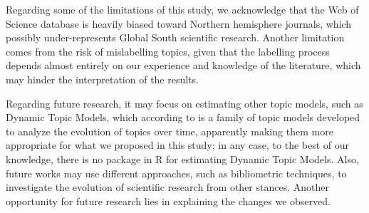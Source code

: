 Regarding some of the limitations of this study, we acknowledge that the Web of Science database is heavily biased toward Northern hemisphere journals, which possibly under-represents Global South scientific research. Another limitation comes from the risk of mislabelling topics, given that the labelling process depends almost entirely on our experience and knowledge of the literature, which may hinder the interpretation of the results. 

Regarding future research, it may focus on estimating other topic models, such as Dynamic Topic Models, which according to \cite{blei_dynamic_2006} is a family of topic models developed to analyze the evolution of topics over time, apparently making them more appropriate for what we proposed in this study; in any case, to the best of our knowledge, there is no package in R for estimating Dynamic Topic Models. Also, future works may use different approaches, such as bibliometric techniques, to investigate the evolution of scientific research from other stances. Another opportunity for future research lies in explaining the changes we observed.